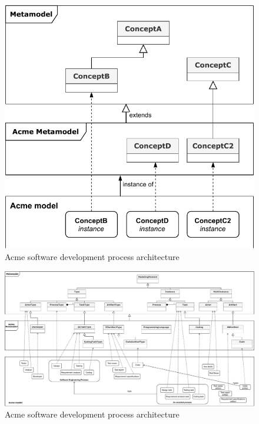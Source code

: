 \begin{figure}
 \centering
    \includegraphics[width=1.0 \columnwidth]{Figures/AcmeArchitecture.pdf}
     \caption{Acme software development process architecture}
    \label{fig:AcmeArchitecture}
\end{figure}

\begin{figure}
 \centering
     \includegraphics[width=1.0 \textwidth]{Figures/AcmeFullArchitecture.pdf}
     \caption{Acme software development process architecture}
    \label{fig:AcmeFullArchitecture}
\end{figure}


